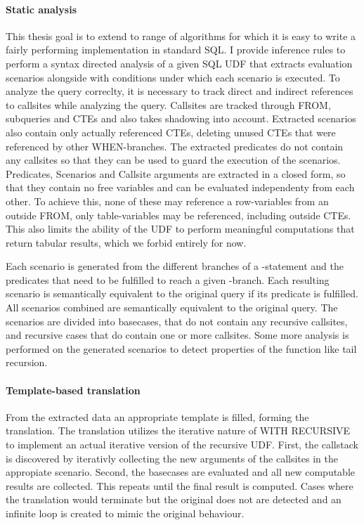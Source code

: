 \paragraph*{Static analysis}
This thesis goal is to extend to range of algorithms for which it is easy to write a fairly performing implementation in standard SQL. I provide inference rules to perform a syntax directed analysis of a given SQL UDF that extracts evaluation scenarios alongside with conditions under which each scenario is executed. To analyze the query correclty, it is necessary to track direct and indirect references to callsites while analyzing the query. Callsites are tracked through FROM, subqueries and CTEs and also takes shadowing into account. Extracted scenarios also contain only actually referenced CTEs, deleting unused CTEs that were referenced by other WHEN-branches. The extracted predicates do not contain any callsites so that they can be used to guard the execution of the scenarios. Predicates, Scenarios and Callsite arguments are extracted in a closed form, so that they contain no free variables and can be evaluated independenty from each other. To achieve this, none of these may reference a row-variables from an outside FROM, only table-variables may be referenced, including outside CTEs. This also limits the ability of the UDF to perform meaningful computations that return tabular results, which we forbid entirely for now.

Each scenario is generated from the different branches of a \CASE-statement and the predicates that need to be fulfilled to reach a given \WHEN-branch. Each resulting scenario is semantically equivalent to the original query if its predicate is fulfilled. All scenarios combined are semantically equivalent to the original query. The scenarios are divided into basecases, that do not contain any recursive callsites, and recursive cases that do contain one or more callsites. Some more analysis is performed on the generated scenarios to detect properties of the function like tail recursion.



\paragraph*{Template-based translation}
From the extracted data an appropriate template is filled, forming the translation. The translation utilizes the iterative nature of WITH RECURSIVE to implement an actual iterative version of the recursive UDF. First, the callstack is discovered by iterativly collecting the new arguments of the callsites in the appropiate scenario. Second, the basecases are evaluated and all new computable results are collected. This repeats until the final result is computed. Cases where the translation would terminate but the original does not are detected and an infinite loop is created to mimic the original behaviour.

